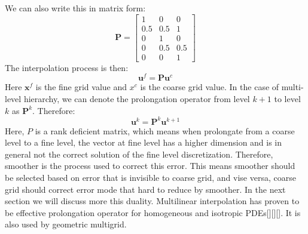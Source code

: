 We can also write this in matrix form:
$$
\mathbf{P} = \begin{bmatrix}
1 & 0 & 0 \\
0.5 & 0.5 & 1 \\ 
0 & 1 & 0 \\
0 & 0.5 & 0.5 \\
0 & 0 & 1
\end{bmatrix}
$$
The interpolation process is then:
\begin{equation}
\mathbf{u}^f = \mathbf{P} \mathbf{u}^c
\end{equation}
Here $\mathbf{x}^f$ is the fine grid value and $x^c$ is the coarse grid value. In the case of multi-level hierarchy, we can denote the prolongation operator from level $k+1$ to level $k$ as $\mathbf{P}^k$. Therefore:
\begin{equation}
\mathbf{u}^k = \mathbf{P}^k \mathbf{u}^{k+1}
\end{equation}
Here, $P$ is a rank deficient matrix, which means when prolongate from a coarse level to a fine level, the vector at fine level has a higher dimension and is in general not the correct solution of the fine level discretization. Therefore, smoother is the process used to correct this error. This means smoother should be selected based on error that is invisible to coarse grid, and vise versa, coarse grid should correct error mode that hard to reduce by smoother. In the next section we will discuss more this duality.  Multilinear interpolation has proven to be effective prolongation operator for homogeneous and isotropic PDEs[\cite{mcadams2010parallel}][\cite{aanjaneya2017power}][\cite{zhu2010efficient}]. It is also used by geometric multigrid. 

